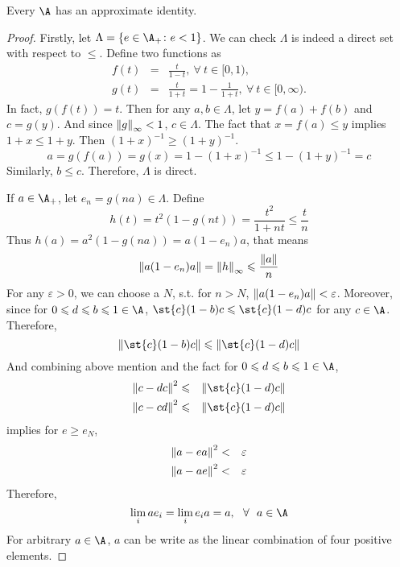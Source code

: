 \begin{thm}
	Every \Cs $\A$ has an approximate identity.
\end{thm}
\begin{proof}
	Firstly, let $\Lambda = \{e \in \A_{+} \colon e < 1\}$. We can check $\Lambda$ is indeed a direct set with respect to $\leqslant$. Define two functions as
	\begin{eqnarray*}
		f(t) &=& \frac{t}{1-t},~ \forall~ t \in [0,1),\\
		g(t) &=& \frac{t}{1+t} = 1 - \frac{1}{1+t},~ \forall~ t \in [0,\infty).
	\end{eqnarray*}
	In fact, $g(f(t))=t$. Then for any $a,b \in \Lambda$, let $y=f(a)+f(b)$ and $c = g(y)$. And since $\left\lVert g\right\lVert_{\infty} < 1$, $c \in \Lambda$. The fact that $x=f(a) \leqslant y$ implies $1+x \leqslant 1+y$. Then $(1+x)^{-1} \geqslant (1+y)^{-1}$.
	\begin{equation*}
		a = g(f(a)) = g(x) = 1 - (1+x)^{-1} \leqslant 1-(1+y)^{-1} =c
	\end{equation*}
	Similarly, $b \leqslant c$. Therefore, $\Lambda$ is direct.
	\item If $a \in \A_{+}$, let $e_n=g(na) \in \Lambda$. Define
	\begin{equation*}
		h(t) = t^2(1-g(nt)) = \frac{t^2}{1+nt} \leqslant \frac{t}{n}
	\end{equation*}
	Thus $h(a)= a^2(1-g(na)) = a(1-e_n)a$, that means
	\begin{equation*}
		\left\lVert a(1-e_n)a\right\lVert = \left\lVert h\right\lVert_{\infty} \leqslant \frac{\left\lVert a\right\lVert}{n}
	\end{equation*}
	For any $\varepsilon > 0$, we can choose a $N$, s.t. for $n > N$, $\left\lVert a(1-e_n)a\right\lVert < \varepsilon$. Moreover, since for $0 \leqslant d \leqslant b \leqslant 1 \in \A$, $\st{c}(1-b)c \leqslant \st{c}(1-d)c$ for any $c \in \A$. Therefore, 
	\begin{equation*}
		\norm{\st{c}(1-b)c} \leqslant \norm{\st{c}(1-d)c}
	\end{equation*}
	And combining above mention and the fact for $0 \leqslant d \leqslant b \leqslant 1 \in \A$,
	\begin{eqnarray*}
		\norm{c-dc}^2 &\leqslant& \norm{\st{c}(1-d)c} \\
		\norm{c-cd}^2 &\leqslant& \norm{\st{c}(1-d)c}
	\end{eqnarray*}
	implies for $e \geqslant e_N$, 
	\begin{eqnarray*}
		\left\lVert a-ea\right\lVert^2 &<& \varepsilon \\
		\left\lVert a-ae\right\lVert^2 &<& \varepsilon
	\end{eqnarray*}
	Therefore, 
	\begin{equation*}
		\lim_{i} ae_i = \lim_{i} e_ia = a,~~\forall~~a \in \A 
	\end{equation*}
	For arbitrary $a \in \A$, $a$ can be write as the linear combination of four positive elements.
\end{proof}
